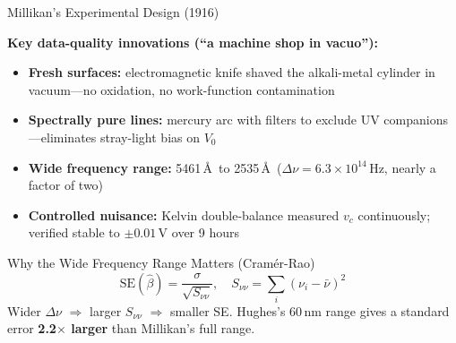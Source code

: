 \documentclass[aspectratio=169,12pt]{beamer}
\begin{document}
\begin{frame}[shrink=5]{Millikan's Experimental Design (1916)}

\textbf{Key data-quality innovations (``a machine shop in vacuo''):}

\begin{itemize}
  \item[\color{mlgreen}$\checkmark$] \textbf{Fresh surfaces:} electromagnetic knife shaved the alkali-metal cylinder in vacuum---no oxidation, no work-function contamination
  \item[\color{mlgreen}$\checkmark$] \textbf{Spectrally pure lines:} mercury arc with filters to exclude UV companions---eliminates stray-light bias on $V_0$
  \item[\color{mlgreen}$\checkmark$] \textbf{Wide frequency range:} 5461\,\AA\ to 2535\,\AA\
    ($\Delta\nu = 6.3\times10^{14}$\,Hz, nearly a factor of two)
  \item[\color{mlgreen}$\checkmark$] \textbf{Controlled nuisance:} Kelvin double-balance measured $v_c$ continuously; verified stable to $\pm 0.01$\,V over 9 hours
\end{itemize}

\bigskip
\begin{block}{Why the Wide Frequency Range Matters (Cram\'er-Rao)}
\[
  \mathrm{SE}(\hat\beta) = \frac{\sigma}{\sqrt{S_{\nu\nu}}},
  \quad S_{\nu\nu} = \sum_i(\nu_i - \bar\nu)^2
\]
Wider $\Delta\nu$ $\Rightarrow$ larger $S_{\nu\nu}$ $\Rightarrow$ smaller SE.
Hughes's 60\,nm range gives a standard error \textbf{2.2$\times$ larger} than
Millikan's full range.
\end{block}

\end{frame}
\end{document}
